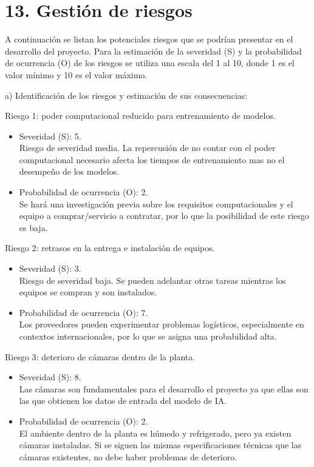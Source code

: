 \documentclass[
11pt, %
]{charter}
\begin{document}
\section{13. Gestión de riesgos}
\label{sec:riesgos}

A continuación se listan los potenciales riesgos que se podrían presentar en el desarrollo del proyecto. Para la estimación de la severidad (S) y la probabilidad de ocurrencia (O) de los riesgos se utiliza una escala del 1 al 10, donde 1 es el valor mínimo y 10 es el valor máximo.

a) Identificación de los riesgos y estimación de sus consecuencias:
 
Riesgo 1: poder computacional reducido para entrenamiento de modelos.
\begin{itemize}
	\item Severidad (S): 5. \\
	Riesgo de severidad media. La repercusión de no contar con el poder computacional necesario afecta los tiempos de entrenamiento mas no el desempeño de los modelos.
	\item Probabilidad de ocurrencia (O): 2. \\
	Se hará una investigación previa sobre los requisitos computacionales y el equipo a comprar/servicio a contratar, por lo que la posibilidad de este riesgo es baja.
\end{itemize}   

Riesgo 2: retrasos en la entrega e instalación de equipos.
\begin{itemize}
	\item Severidad (S): 3. \\
	Riesgo de severidad baja. Se pueden adelantar otras tareas mientras los equipos se compran y son instalados.
	\item Probabilidad de ocurrencia (O): 7. \\
	Los proveedores pueden experimentar problemas logísticos, especialmente en contextos internacionales, por lo que se asigna una probabilidad alta.
\end{itemize}

Riesgo 3: deterioro de cámaras dentro de la planta.
\begin{itemize}
	\item Severidad (S):  8.\\
	Las cámaras son fundamentales para el desarrollo el proyecto ya que ellas son las que obtienen los datos de entrada del modelo de IA.
	\item Probabilidad de ocurrencia (O): 2.\\
	El ambiente dentro de la planta es húmedo y refrigerado, pero ya existen cámaras instaladas. Si se siguen las mismas especificaciones técnicas que las cámaras existentes, no debe haber problemas de deterioro.
\end{itemize}
\end{document}
